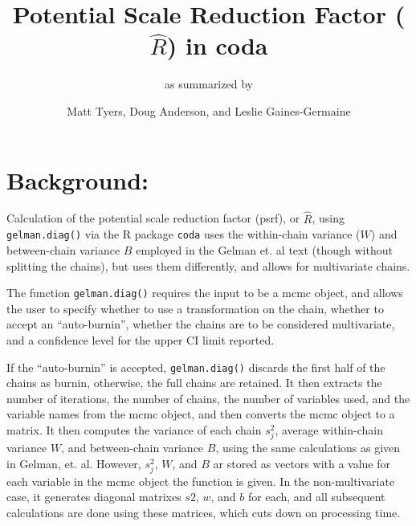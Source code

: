 \documentclass[11pt]{article}\usepackage[]{graphicx}\usepackage[]{color}
\begin{document}
\title{{\bf Potential Scale Reduction Factor ($\widehat{R}$) in} coda}
\author{as summarized by}
\date{Matt Tyers, Doug Anderson, and {\color{red}L\color{blue}e\color{orange}s\color{green}l\color{magenta}i\color{cyan}e \color{violet}G\color{lime}a\color{red}i\color{blue}n\color{orange}e\color{green}s\color{magenta}-\color{cyan}G\color{violet}e\color{lime}r\color{red}m\color{blue}a\color{orange}i\color{green}n\color{magenta}e}}

\maketitle



\section{Background:}
Calculation of the potential scale reduction factor (psrf), or $\widehat{R}$, using \verb|gelman.diag()| via the R package \verb|coda| uses the within-chain variance ($W$) and between-chain variance $B$ employed in the Gelman et. al text (though without splitting the chains), but uses them differently, and allows for multivariate chains.

The function \verb|gelman.diag()| requires the input to be a mcmc object, and allows the user to specify whether to use a transformation on the chain, whether to accept an ``auto-burnin'', whether the chains are to be considered multivariate, and a confidence level for the upper CI limit reported.

If the ``auto-burnin'' is accepted, \verb|gelman.diag()| discards the first half of the chains as burnin, otherwise, the full chains are retained. It then extracts the number of iterations, the number of chains, the number of variables used, and the variable names from the mcmc object, and then converts the mcmc object to a matrix. It then computes the variance of each chain $s_j^2$, average within-chain variance $W$, and between-chain variance $B$, using the same calculations as given in Gelman, et. al. However, $s_j^2$, $W$, and $B$ ar stored as vectors with a value for each variable in the mcmc object the function is given. In the non-multivariate case, it generates diagonal matrixes $s2$, $w$, and $b$ for each, and all subsequent calculations are done using these matrices, which cuts down on processing time. 
\end{document}
